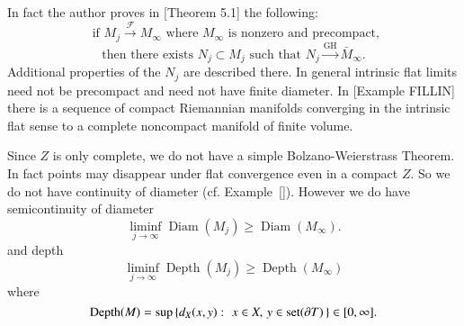 \documentclass[12pt]{amsart}
\begin{document}
In fact the author proves in \cite{Sormani-AA}[Theorem 5.1] the following:
\begin{equation}
\textrm{ if }M_j {\stackrel {\mathcal{F}}{\longrightarrow} } M_\infty \textrm{ where } M_\infty \textrm{ is nonzero and precompact,}
\end{equation}   
\begin{equation}
\textrm{then there exists } N_j \subset M_j
\textrm{ such that } N_j {\stackrel { \textrm{GH}}{\longrightarrow} } \bar{M}_\infty.  
\end{equation}
Additional
properties of the $N_j$ are described there.  In general intrinsic
flat limits need
not be precompact and need not have finite diameter. In \cite{SorWen2}[Example FILLIN] there is a sequence of compact Riemannian manifolds converging in the
intrinsic flat sense to a complete noncompact manifold of finite volume.

Since $Z$ is only complete, we do not have a simple Bolzano-Weierstrass
Theorem.  In fact points may disappear under flat convergence even in
a compact $Z$.   So we do not have continuity of diameter (cf. Example~\ref{}).   However
we do have semicontinuity of diameter
\begin{equation}\label{diam-semi}
\liminf_{j\to \infty} {\operatorname{Diam}}(M_j) \ge {\operatorname{Diam}}(M_\infty).
\end{equation}
and depth
\begin{equation}\label{depth-semi}
\liminf_{j\to \infty} {\operatorname{Depth}}(M_j) \ge {\operatorname{Depth}}(M_\infty)
\end{equation}
where 
\begin{equation}\label{defn-depth}
{\operatorname{Depth}}(M)=\sup\left\{ d_X(x,y): \,\, x\in X, \, y\in {{\rm{set}}}(\partial T)\,\right\} \in [0,\infty].
\end{equation}
\end{document}
